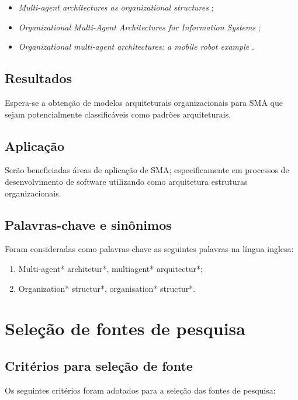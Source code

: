 \begin{itemize}
    \item \textit{Multi-agent architectures as organizational structures} \cite{kolp2006};
    \item \textit{Organizational Multi-Agent Architectures for Information Systems} \cite{do2003};
    \item \textit{Organizational multi-agent architectures: a mobile robot example} \cite{kolp2002}.
\end{itemize}


\subsection{Resultados}
Espera-se a obtenção de modelos arquiteturais organizacionais para SMA que sejam potencialmente classificáveis como padrões arquiteturais.

\subsection{Aplicação}
Serão beneficiadas áreas de aplicação de SMA; especificamente em processos de desenvolvimento de software utilizando como arquitetura estruturas organizacionais. 


\subsection{Palavras-chave e sinônimos}

Foram consideradas como palavras-chave as seguintes palavras na língua inglesa:

\begin{enumerate}
    \item Multi-agent* architetur*, multiagent* arquitectur*;
    \item Organization* structur*, organisation* structur*.
\end{enumerate}

\section{Seleção de fontes de pesquisa}

\subsection{Critérios para seleção de fonte}
Os seguintes critérios foram adotados para a seleção das fontes de pesquisa:

